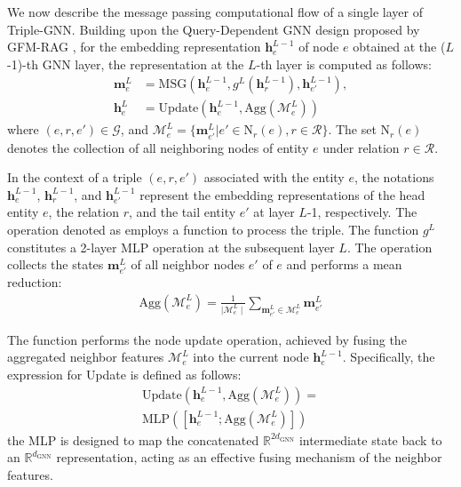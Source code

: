 \documentclass[11pt]{article}
\begin{document}
We now describe the message passing computational flow of a single layer of Triple-GNN. Building upon the Query-Dependent GNN design proposed by GFM-RAG \cite{luo2025gfmrag_arxiv}, for the embedding representation $\mathbf{h}_e^{L-1}$ of node $e$ obtained at the ($L$-1)-th GNN layer, the representation at the $L$-th layer is computed as follows:
\begin{align}
\mathbf{m}_e^{L}& = \text{MSG}(\mathbf{h}_e^{L-1}, g^{L}(\mathbf{h}_r^{L-1}), \mathbf{h}_{e'}^{L-1}), \\
\mathbf{h}_e^{L}& = \text{Update}(\mathbf{h}_e^{L-1}, \text{Agg}(\mathcal{M}_{e}^L))
\end{align}
where $(e, r, e') \in \mathcal{G}$, and $\mathcal{M}_{e}^L =\{ \mathbf{m}^L_{e'} | e' \in \text{N}_r(e), r \in \mathcal{R} \}$. The set $\text{N}_r(e)$ denotes the collection of all neighboring nodes of entity $e$ under relation $r \in \mathcal{R}$. 

In the context of a triple $(e, r, e')$ associated with the entity $e$, the notations $\mathbf{h}_e^{L-1}$, $\mathbf{h}_r^{L-1}$, and $\mathbf{h}_{e'}^{L-1}$ represent the embedding representations of the head entity $e$, the relation $r$, and the tail entity $e'$ at layer $L$-1, respectively. The operation denoted as  employs a  \cite{yang2015embedding} function to process the triple. The function $g^L$ constitutes a 2-layer MLP operation at the subsequent layer $L$. The  operation collects the states $\mathbf{m}_{e'}^L$ of all neighbor nodes $e'$ of $e$ and performs a mean reduction:
\begin{align}
\text{Agg}(\mathcal{M}_{e}^L) = \frac{1}{\mid \mathcal{M}_{e}^L \mid}\sum_{\textbf{m}_{e'}^L \in \mathcal{M}_{e}^L} \textbf{m}_{e'}^L
\end{align}

The  function performs the node update operation, achieved by fusing the aggregated neighbor features $\mathcal{M}_{e}^L$ into the current node $\textbf{h}_e^{L-1}$. Specifically, the expression for Update is defined as follows:
\begin{align}
\text{Update}(\textbf{h}_e^{L-1}, \text{Agg}(\mathcal{M}_{e}^L)) = \nonumber \\
\text{MLP}([\textbf{h}_e^{L-1}; \text{Agg}(\mathcal{M}_{e}^L)])
\end{align}
the MLP is designed to map the concatenated 
$\mathbb{R}^{2{d_\text{GNN}}}$ intermediate state back to an $\mathbb{R}^{d_\text{GNN}}$ representation, acting as an effective fusing mechanism of the neighbor features.
\end{document}
